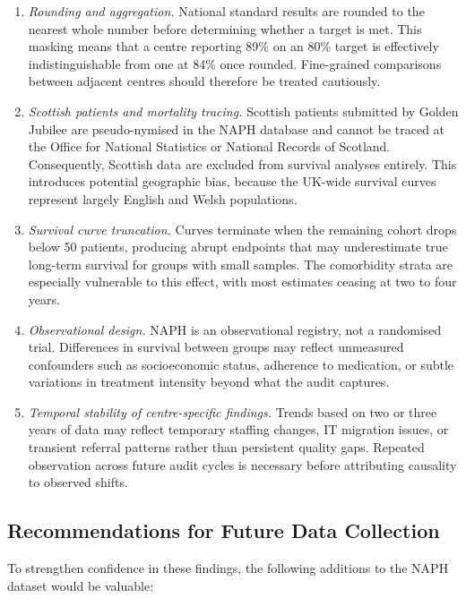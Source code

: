 \documentclass[11pt,a4paper]{article}
\begin{document}
\begin{enumerate}[leftmargin=*]
\item \textit{Rounding and aggregation.} National standard results are rounded to the nearest whole number before determining whether a target is met. This masking means that a centre reporting 89\% on an 80\% target is effectively indistinguishable from one at 84\% once rounded. Fine-grained comparisons between adjacent centres should therefore be treated cautiously.

\item \textit{Scottish patients and mortality tracing.} Scottish patients submitted by Golden Jubilee are pseudo-nymised in the NAPH database and cannot be traced at the Office for National Statistics or National Records of Scotland. Consequently, Scottish data are excluded from survival analyses entirely. This introduces potential geographic bias, because the UK-wide survival curves represent largely English and Welsh populations.

\item \textit{Survival curve truncation.} Curves terminate when the remaining cohort drops below 50 patients, producing abrupt endpoints that may underestimate true long-term survival for groups with small samples. The comorbidity strata are especially vulnerable to this effect, with most estimates ceasing at two to four years.

\item \textit{Observational design.} NAPH is an observational registry, not a randomised trial. Differences in survival between groups may reflect unmeasured confounders such as socioeconomic status, adherence to medication, or subtle variations in treatment intensity beyond what the audit captures.

\item \textit{Temporal stability of centre-specific findings.} Trends based on two or three years of data may reflect temporary staffing changes, IT migration issues, or transient referral patterns rather than persistent quality gaps. Repeated observation across future audit cycles is necessary before attributing causality to observed shifts.
\end{enumerate}

\subsection{Recommendations for Future Data Collection}

To strengthen confidence in these findings, the following additions to the NAPH dataset would be valuable:
\end{document}
